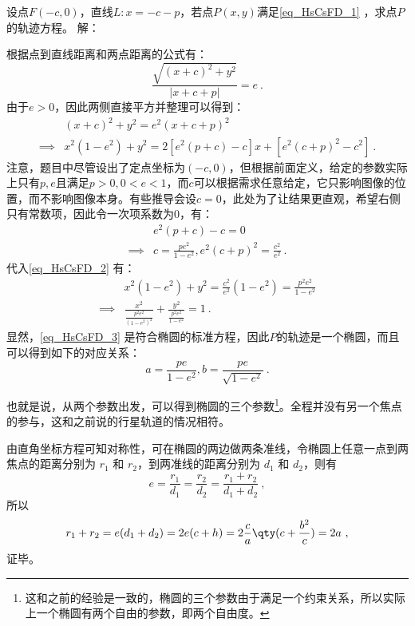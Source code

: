 \begin{example}{设点$F(-c,0)$，直线$L:x=-c-p$，若点$P(x,y)$满足\autoref{eq_HsCsFD_1} ，求点$P$的轨迹方程。}\label{ex_HsCsFD_1}
解：

根据点到直线距离和两点距离的公式有：
\begin{equation}
\frac{\sqrt{(x + c)^2 + y^2}}{|x + c + p|} = e~.
\end{equation}
由于$e>0$，因此两侧直接平方并整理可以得到：
\begin{equation}\label{eq_HsCsFD_2}
\begin{split}
&(x + c)^2 + y^2 = e^2(x + c + p)^2\\\implies &x^2(1 - e^2)+ y^2=2[e^2(p+c)-c]x + [e^2(c + p)^2 - c^2]~.
\end{split}
\end{equation}
注意，题目中尽管设出了定点坐标为$(-c,0)$，但根据前面定义，给定的参数实际上只有$p,e$且满足$p>0,0<e<1$，而$c$可以根据需求任意给定，它只影响图像的位置，而不影响图像本身。有些推导会设$c=0$，此处为了让结果更直观，希望右侧只有常数项，因此令一次项系数为$0$，有：
\begin{equation}
\begin{split}
&e^2(p+c)-c=0\\\implies &c=\frac{pe^2}{1-e^2},e^2(c+p)^2=\frac{c^2}{e^2}~.
\end{split}
\end{equation}
代入\autoref{eq_HsCsFD_2} 有：
\begin{equation}\label{eq_HsCsFD_3}
\begin{split}
&x^2(1 - e^2)+ y^2= \frac{c^2}{e^2}(1-e^2)=\frac{p^2 e^2}{1-e^2}\\
\implies&\frac{x^2}{\displaystyle\frac{p^2 e^2}{(1-e^2)^2}}+ \frac{y^2}{\displaystyle\frac{p^2 e^2}{1-e^2}}= 1~.
\end{split}
\end{equation}
显然，\autoref{eq_HsCsFD_3} 是符合椭圆的标准方程，因此$P$的轨迹是一个椭圆，而且可以得到如下的对应关系：
\begin{equation}
a=\frac{p e}{1-e^2},b=\frac{p e}{\sqrt{1-e^2}}~.
\end{equation}
\end{example}
也就是说，从两个参数出发，可以得到椭圆的三个参数\footnote{这和之前的经验是一致的，椭圆的三个参数由于满足一个约束关系，所以实际上一个椭圆有两个自由的参数，即两个自由度。}。全程并没有另一个焦点的参与，这和之前说的行星轨道的情况相符。

由直角坐标方程可知对称性，可在椭圆的两边做两条准线，令椭圆上任意一点到两焦点的距离分别为 $r_1$ 和 $r_2$，到两准线的距离分别为 $d_1$ 和 $d_2$，则有
\begin{equation}
e = \frac{r_1}{d_1} = \frac{r_2}{d_2} = \frac{r_1 + r_2}{d_1 + d_2}~,
\end{equation}
所以
\begin{equation}
r_1 + r_2 = e(d_1+d_2) = 2e(c + h) = 2\frac{c}{a} \qty( c + \frac{b^2}{c} ) = 2a~,
\end{equation}
证毕。
